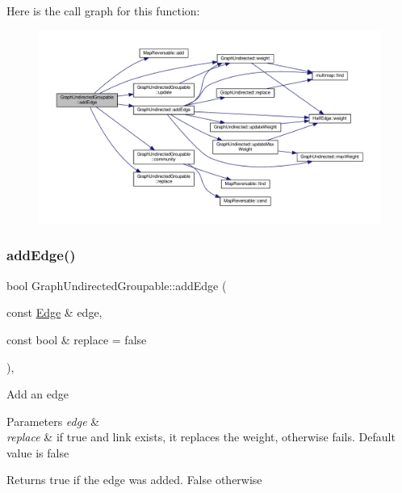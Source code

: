 Here is the call graph for this function\+:
\nopagebreak
\begin{figure}[H]
\begin{center}
\leavevmode
\includegraphics[width=350pt]{classGraphUndirectedGroupable_a8c010517bff903a50807e6e8ad8cc6db_cgraph}
\end{center}
\end{figure}
\mbox{\label{classGraphUndirectedGroupable_a2efe963916349ac6615721ab85a93ceb}} 
\subsubsection{\texorpdfstring{add\+Edge()}{addEdge()}\hspace{0.1cm}{\footnotesize\ttfamily [2/2]}}
{\footnotesize\ttfamily bool Graph\+Undirected\+Groupable\+::add\+Edge (\begin{DoxyParamCaption}\item[{const \hyperlink{classEdge}{Edge} \&}]{edge,  }\item[{const bool \&}]{replace = {\ttfamily false} }\end{DoxyParamCaption})\hspace{0.3cm}{\ttfamily [inline]}, {\ttfamily [virtual]}}

Add an edge


\begin{DoxyParams}{Parameters}
{\em edge} & \\
\hline
{\em replace} & if true and link exists, it replaces the weight, otherwise fails. Default value is false \\
\hline
\end{DoxyParams}
\begin{DoxyReturn}{Returns}
true if the edge was added. False otherwise 
\end{DoxyReturn}


